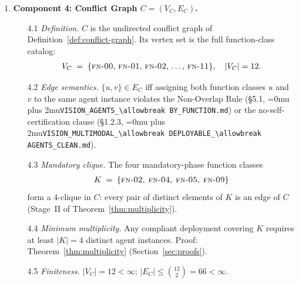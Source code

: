 \documentclass[12pt]{article}
\theoremstyle{definition}
\DeclareRobustCommand{\code}[1]{\begingroup\Urlmuskip=0mu plus 2mu\relax\nolinkurl{#1}\endgroup}
\newcommand{\FN}[1]{\textsc{fn-#1}}
\DeclareMathOperator{\Approved}{Approved}
\newcommand{\VisionClean}{\code{VISION\_MULTIMODAL\_\allowbreak DEPLOYABLE\_\allowbreak AGENTS\_CLEAN.md}}
\newcommand{\VisionFunc}{\code{VISION\_AGENTS\_\allowbreak BY\_FUNCTION.md}}
\begin{document}
\begin{enumerate}
\begin{enumerate}
               lower (more trusted) tier.  No other agent may alter
               $\tau(c)$ downward.  Authority: Table~8.1,
               \VisionClean{}.
    \item[3.4] \emph{Invariant.}
               Every subagent-originated content item $c$ satisfies
               $\tau(c) = \mathrm{T\text{-}3}$ throughout a session
               unless it has been the subject of an explicit
               \FN{08} $\Approved$ certificate event.
               Proof: Theorem~\ref{thm:trust}
               (Section~\ref{sec:proofs}).
    \item[3.5] \emph{Well-definedness.}
               $\tau$ is a total function: every content item receives
               a tier assignment at the moment of production (H2 of
               Theorem~\ref{thm:trust}).  No content item is left
               unclassified.
  \end{enumerate}

  \item \textbf{Component 4: Conflict Graph $C = (V_C, E_C)$.}
  \begin{enumerate}
    \item[4.1] \emph{Definition.}
               $C$ is the undirected conflict graph of
               Definition~\ref{def:conflict-graph}.  Its vertex set
               is the full function-class catalog:
               \begin{align}
                 V_C
                 \;=\;
                 \{\FN{00},\,\FN{01},\,\FN{02},\,\ldots,\,\FN{11}\},
                 \quad
                 |V_C| = 12.
                 \label{eq:VC-def}
               \end{align}
    \item[4.2] \emph{Edge semantics.}
               $\{u,v\} \in E_C$ iff assigning both function classes
               $u$ and $v$ to the same agent instance violates the
               Non-Overlap Rule (\S5.1, \VisionFunc{}) or the
               no-self-certification clause (\S1.2.3, \VisionClean{}).
    \item[4.3] \emph{Mandatory clique.}
               The four mandatory-phase function classes
               \begin{align}
                 K
                 \;=\;
                 \{\FN{02},\;\FN{04},\;\FN{05},\;\FN{09}\}
                 \label{eq:K-def}
               \end{align}
               form a $4$-clique in $C$: every pair of distinct
               elements of $K$ is an edge of $C$
               (Stage~II of Theorem~\ref{thm:multiplicity}).
    \item[4.4] \emph{Minimum multiplicity.}
               Any compliant deployment covering $K$ requires at least
               $|K| = 4$ distinct agent instances.
               Proof: Theorem~\ref{thm:multiplicity}
               (Section~\ref{sec:proofs}).
    \item[4.5] \emph{Finiteness.}
               $|V_C| = 12 < \infty$;
               $|E_C| \leq \binom{12}{2} = 66 < \infty$.
  \end{enumerate}


\end{enumerate}
\end{document}
